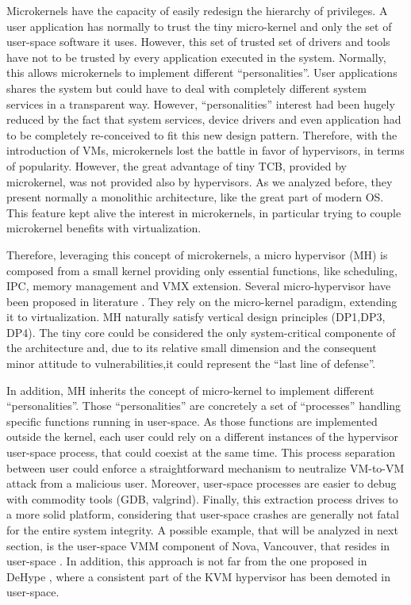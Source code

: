 \documentclass{sig-alternate}
\begin{document}
Microkernels have the capacity of easily redesign the hierarchy of privileges. A user application has normally to trust the tiny micro-kernel and only the set of user-space software it uses. However, this set of trusted set of drivers and tools have not to be trusted by every application executed in the system. Normally, this allows microkernels to implement different ``personalities''. User applications shares the system but could have to deal with completely different system services in a transparent way. However, ``personalities'' interest had been hugely reduced by the fact that system services, device drivers and even application had to be completely re-conceived to fit this new design pattern. Therefore, with the introduction of VMs, microkernels lost the battle in favor of hypervisors, in terms of popularity. However, the great advantage of tiny TCB, provided by microkernel, was not provided also by hypervisors. As we analyzed before, they present normally a monolithic architecture, like the great part of modern OS. This feature kept alive the interest in microkernels, in particular trying to couple microkernel benefits with virtualization.

Therefore, leveraging this concept of microkernels, a micro hypervisor (MH) is composed from a small kernel providing only essential functions, like scheduling, IPC, memory management and VMX extension. Several micro-hypervisor have been proposed in literature \cite{xmhf, nova}. They rely on the micro-kernel paradigm, extending it to virtualization. MH naturally satisfy vertical design principles (DP1,DP3, DP4). The tiny core could be considered the only system-critical componente of the architecture and, due to its relative small dimension and the consequent minor attitude to vulnerabilities,it could represent the ``last line of defense''.

In addition, MH inherits the concept of micro-kernel to implement different ``personalities''. Those ``personalities'' are concretely a set of ``processes'' handling specific functions running in user-space. As those functions are implemented outside the kernel, each user could rely on a different instances of the hypervisor user-space process, that could coexist at the same time. This process separation between user could enforce a straightforward mechanism to neutralize VM-to-VM attack from a malicious user. Moreover, user-space processes are easier to debug with commodity tools (GDB, valgrind).
Finally, this extraction process drives to a more solid platform, considering that user-space crashes are generally not fatal for the entire system integrity.  A possible example, that will be analyzed in next section, is the user-space VMM component of Nova, Vancouver, that resides in user-space \cite{nova}.
In addition, this approach is not far from the one proposed in DeHype \cite{wu2013TamHosHypMosDepExe}, where a consistent part of the KVM hypervisor has been demoted in user-space.
\end{document}
